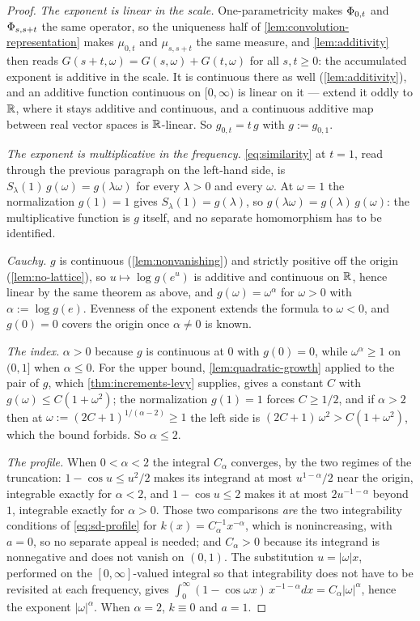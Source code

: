 \begin{proof}
\leanok
\emph{The exponent is linear in the scale.} One-parametricity makes $\Phi_{0,t}$ and
$\Phi_{s,s+t}$ the same operator, so the uniqueness half of
\ref{lem:convolution-representation} makes $\mu_{0,t}$ and $\mu_{s,s+t}$ the same measure, and
\ref{lem:additivity} then reads $G(s+t,\omega) = G(s,\omega) + G(t,\omega)$ for all
$s,t \ge 0$: the accumulated exponent is additive in the scale. It is continuous there as well
(\ref{lem:additivity}), and an additive function continuous on $[0,\infty)$ is linear on it ---
extend it oddly to $\mathbb{R}$, where it stays additive and continuous, and a continuous additive map
between real vector spaces is $\mathbb{R}$-linear. So $g_{0,t} = t\,g$ with $g := g_{0,1}$.

\emph{The exponent is multiplicative in the frequency.} \ref{eq:similarity} at $t = 1$, read
through the previous paragraph on the left-hand side, is
$S_\lambda(1)\,g(\omega) = g(\lambda\omega)$ for every $\lambda > 0$ and every $\omega$. At
$\omega = 1$ the normalization $g(1) = 1$ gives $S_\lambda(1) = g(\lambda)$, so
$g(\lambda\omega) = g(\lambda)\,g(\omega)$: the multiplicative function is $g$ itself, and no
separate homomorphism has to be identified.

\emph{Cauchy.} $g$ is continuous (\ref{lem:nonvanishing}) and strictly positive off the origin
(\ref{lem:no-lattice}), so $u \mapsto \log g(e^u)$ is additive and continuous on $\mathbb{R}$, hence
linear by the same theorem as above, and $g(\omega) = \omega^\alpha$ for $\omega > 0$ with
$\alpha := \log g(e)$. Evenness of the exponent extends the formula to $\omega < 0$, and
$g(0) = 0$ covers the origin once $\alpha \ne 0$ is known.

\emph{The index.} $\alpha > 0$ because $g$ is continuous at $0$ with $g(0) = 0$, while
$\omega^\alpha \ge 1$ on $(0,1]$ when $\alpha \le 0$. For the upper bound,
\ref{lem:quadratic-growth} applied to the \Levy{} pair of $g$, which \ref{thm:increments-levy}
supplies, gives a constant $C$ with $g(\omega) \le C(1+\omega^2)$; the normalization $g(1) = 1$
forces $C \ge 1/2$, and if $\alpha > 2$ then at $\omega := (2C+1)^{1/(\alpha-2)} \ge 1$ the left
side is $(2C+1)\,\omega^2 > C(1+\omega^2)$, which the bound forbids. So $\alpha \le 2$.

\emph{The profile.} When $0 < \alpha < 2$ the integral $C_\alpha$ converges, by the two regimes
of the truncation: $1 - \cos u \le u^2/2$ makes its integrand at most $u^{1-\alpha}/2$ near the
origin, integrable exactly for $\alpha < 2$, and $1 - \cos u \le 2$ makes it at most
$2u^{-1-\alpha}$ beyond $1$, integrable exactly for $\alpha > 0$. Those two comparisons
\emph{are} the two integrability conditions of \ref{eq:sd-profile} for
$k(x) = C_\alpha^{-1}x^{-\alpha}$, which is nonincreasing, with $a = 0$, so no separate appeal
is needed; and $C_\alpha > 0$ because its integrand is nonnegative and does not vanish on
$(0,1)$. The substitution $u = |\omega|x$, performed on the $[0,\infty]$-valued integral so that
integrability does not have to be revisited at each frequency, gives
$\int_0^\infty (1-\cos\omega x)\,x^{-1-\alpha}dx = C_\alpha|\omega|^\alpha$, hence the exponent
$|\omega|^\alpha$. When $\alpha = 2$, $k \equiv 0$ and $a = 1$.
\end{proof}

